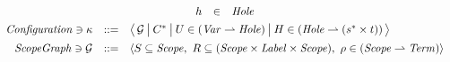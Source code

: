 \begin{gather*}
  \begin{array}{rcl}
    h & \in & \mathit{Hole}
  \end{array}
  \\
  \begin{array}{rcl}
    \mathit{Configuration}\ni \kappa & ::= & \opsRSState
      { \mathcal{G} }
      { C^\ast }
      { U \in (\mathit{Var} \rightharpoonup \mathit{Hole}) }
      { H \in (\mathit{Hole} \rightharpoonup (s^\ast \times t )) }
    \\[0.5em]
    \mathit{ScopeGraph}\ni \mathcal{G} & ::= & \langle
      S \subseteq \mathit{Scope},\ 
      R \subseteq ( \mathit{Scope} \times \mathit{Label} \times \mathit{Scope} ),\ 
      \rho \in (\mathit{Scope} \rightharpoonup \mathit{Term})
      \rangle
  \end{array}
\end{gather*}
